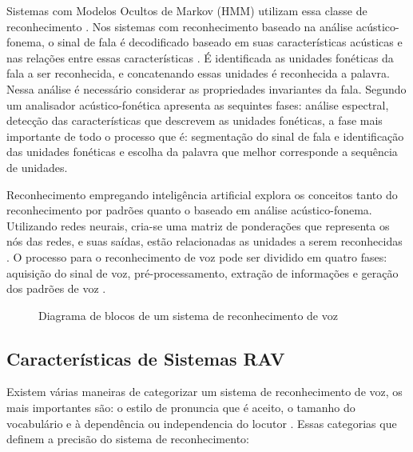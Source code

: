 Sistemas com Modelos Ocultos de Markov (HMM) utilizam essa classe de reconhecimento \cite{AvaliaTecJose}. Nos sistemas com reconhecimento baseado na análise acústico-fonema, o sinal de fala é decodificado baseado em suas características acústicas e nas relações entre essas características \cite{DigSpeechNejat}. É identificada as unidades fonéticas da fala a ser reconhecida, e concatenando essas unidades é reconhecida a palavra. Nessa análise é necessário considerar as propriedades invariantes da fala. Segundo  um analisador acústico-fonética apresenta as sequintes fases: análise espectral, detecção das características que descrevem as unidades fonéticas, a fase mais importante de todo o processo que é: segmentação do sinal de fala e identificação das unidades fonéticas e escolha da palavra que melhor corresponde a sequência de unidades. 

Reconhecimento empregando inteligência artificial explora os conceitos tanto do reconhecimento por padrões quanto o baseado em análise acústico-fonema. Utilizando redes neurais, cria-se uma matriz de ponderações que representa os nós das redes, e suas saídas, estão relacionadas as unidades a serem reconhecidas \cite{AvaliaTecJose}.
O processo para o reconhecimento de voz pode ser dividido em quatro fases: aquisição do sinal de voz, pré-processamento, extração de informações e geração dos padrões de voz \cite{RavIsolAnderson}.

\begin{figure}[H]
\centering

\caption{Diagrama de blocos de um sistema de reconhecimento de voz}
\end{figure}


\subsection{Características de Sistemas RAV}\label{sec:red_neu}

Existem várias maneiras de categorizar um sistema de reconhecimento de voz, os mais importantes são: o estilo de pronuncia que é aceito, o tamanho do vocabulário e à dependência ou independencia do locutor \cite{RavIsolMartins}. Essas categorias que definem a precisão do sistema de reconhecimento:

